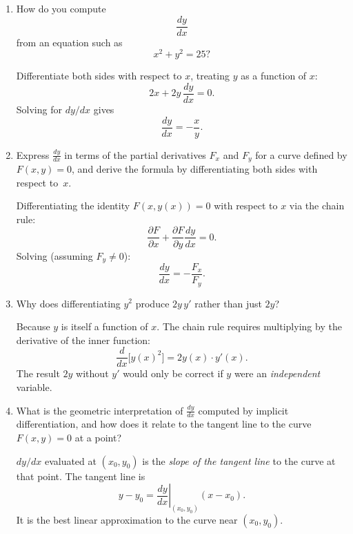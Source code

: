 \documentclass{self-check}
\begin{document}
\begin{enumerate}[leftmargin=*, itemsep=8pt]
  \item How do you compute \[ \frac{dy}{dx} \] from an equation such
    as \[ x^2+y^2=25? \]

    \begin{answer} Differentiate both sides with respect to $x$,
      treating $y$ as a function of $x$:
      \[
        2x + 2y\,\frac{dy}{dx} = 0.
      \]
      Solving for $dy/dx$ gives
      \[
        \frac{dy}{dx} = -\frac{x}{y}.
      \]
    \end{answer}

  \item Express $\frac{dy}{dx}$ in terms of the partial derivatives
    $F_x$ and $F_y$ for a curve defined by $F(x,y)=0$, and derive the
    formula by differentiating both sides with respect to~$x$.

    \begin{answer} Differentiating the identity $F(x,y(x))=0$ with
      respect to $x$ via the chain rule:
      \[
        \frac{\partial F}{\partial x} + \frac{\partial F}{\partial
        y}\frac{dy}{dx} = 0.
      \]
      Solving (assuming $F_y\neq 0$):
      \[
        \frac{dy}{dx} = -\frac{F_x}{F_y}.
      \]
    \end{answer}

  \item Why does differentiating \(y^2\) produce \(2y\,y'\) rather
    than just \(2y\)?

    \begin{answer} Because $y$ is itself a function of $x$.  The
      chain rule requires multiplying by the derivative of the inner function:
      \[
        \frac{d}{dx}\bigl[y(x)^2\bigr] = 2y(x)\cdot y'(x).
      \]
      The result $2y$ without $y'$ would only be correct if $y$ were an
      \emph{independent} variable.
    \end{answer}

  \item What is the geometric interpretation of $\frac{dy}{dx}$
    computed by implicit differentiation, and how does it relate to
    the tangent line to the curve $F(x,y)=0$ at a point?

    \begin{answer} $dy/dx$ evaluated at $(x_0,y_0)$ is the
      \emph{slope of the tangent line} to the curve at that point.  The
      tangent line is
      \[
        y - y_0 = \left.\frac{dy}{dx}\right|_{(x_0,y_0)}(x-x_0).
      \]
      It is the best linear approximation to the curve near $(x_0,y_0)$.
    \end{answer}


\end{enumerate}
\end{document}
